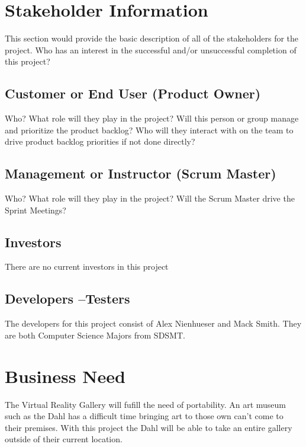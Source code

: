 \section{ Stakeholder Information}


This section would provide the basic description of all of the stakeholders for 
the project.  Who has an interest in the successful and/or unsuccessful completion 
of this project? 


\subsection{Customer or End User (Product Owner)}
Who?  What role will they play in the project?  Will this person or group manage 
and prioritize the product backlog?  Who will they interact with on the team to 
drive product backlog priorities if not done directly? 

\subsection{Management or Instructor (Scrum Master)}
Who?  What role will they play in the project?  Will the Scrum Master drive the 
Sprint Meetings? 


\subsection{Investors}
There are no current investors in this project


\subsection{Developers --Testers}
The developers for this project consist of Alex Nienhueser and Mack Smith. They are both Computer 
Science Majors from SDSMT.



\section{Business Need}
The Virtual Reality Gallery will fufill the need of portability. An art museum such as the Dahl has a difficult time bringing art to those own can't come to their premises. With this project the Dahl will be able to take an entire gallery outside of their current location.


